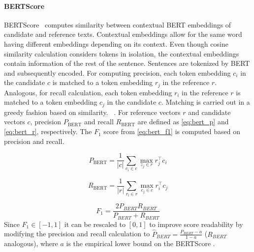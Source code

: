 \paragraph{BERTScore}
BERTScore~\citep{hanna_fine_grained_2021} computes similarity between contextual BERT embeddings of candidate and reference texts. 
Contextual embeddings allow for the same word having different embeddings depending on its context.
Even though cosine similarity calculation considers tokens in isolation, the contextual embeddings contain information of the rest of the sentence.
Sentences are tokenized by BERT and subsequently encoded.
For computing precision, each token embedding $c_i$ in the candidate $c$ is matched to a token embedding $r_j$ in the reference $r$.
Analogous, for recall calculation, each token embedding $r_i$ in the reference $r$ is matched to a token embedding $c_j$ in the candidate $c$.
Matching is carried out in a greedy fashion based on similarity.
~\citep{zhang_bertscore_2020}.
For reference vectors $r$ and candidate vectors $c$, precision $P_{\text{BERT}}$ and recall $R_{\text{BERT}}$ are defined as \autoref{eq:bert_p} and \autoref{eq:bert_r}, respectively.
The $F_1$ score from \autoref{eq:bert_f1} is computed based on precision and recall.

\begin{equation}
    P_{\text{BERT}} = \frac{1}{|c|} \sum_{c_i \in c} \max_{z_j \in r} r_j^\top c_i
\label{eq:bert_p}
\end{equation}

\begin{equation}
    R_{\text{BERT}} = \frac{1}{|r|} \sum_{r_i \in r} \max_{c_j \in c} r_i^\top c_j
\label{eq:bert_r}
\end{equation}

\begin{equation}
    F_1 = \frac{2 P_{BERT} R_{BERT}}{P_{BERT} + R_{BERT}} 
\label{eq:bert_f1}
\end{equation}
Since $F_1 \in \left[-1,1\right]$ it can be rescaled to $[0,1]$ to improve score readability by modifying the precision and recall calculation 
to $\hat{P}_{BERT} = \frac{P_{BERT} - a}{1 - a}$ ($R_{BERT}$ analogous), where $a$ is the empirical lower bound on the BERTScore \citep{zhang_bertscore_2020,hanna_fine_grained_2021}.


